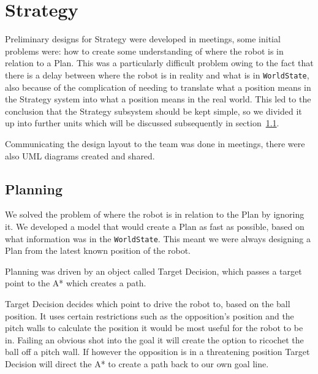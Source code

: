 \section{Strategy}


Preliminary designs for Strategy were developed in meetings, some initial 
problems were:
how to create some understanding of where the robot is in relation to a Plan. 
This
was a particularly difficult problem owing to the fact that there is a delay 
between where the robot is in reality and what is in \texttt{WorldState}, also 
because of the complication of needing to translate what a position means in the 
Strategy system into what a position means in the real world. This led to the 
conclusion that the Strategy subsystem should be kept simple, so we divided it 
up into further units which will be discussed subsequently in
section~\ref{sec:planning}.

Communicating the design layout to the team was done in meetings, there were 
also UML diagrams created and shared.

\subsection{Planning}
\label{sec:planning}


We solved the problem of where the robot is in relation to the Plan by ignoring
it. We developed a model that would create a Plan as fast as possible, based on
what information was in the \texttt{WorldState}. This meant we were always
designing a Plan from the latest known position of the robot.

Planning was driven by an object called Target Decision, which passes a target
point to the A* which creates a path.


Target Decision decides which point to drive the robot to, based on the ball
position. It uses certain restrictions such as the opposition's position and
the pitch walls to calculate the position it would be most useful for the robot
to be in. Failing an obvious shot into the goal it will create the option to
ricochet the ball off a pitch wall. If however the opposition is in a
threatening position Target Decision will direct the A* to create a path back to
our own goal line.

